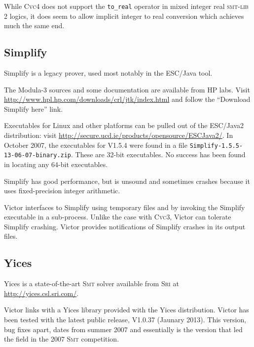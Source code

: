 \documentclass[12pt,fleqn]{article}
\newcommand{\cvcthree}{\textsc{Cvc}3}
\newcommand{\cvcfour}{\textsc{Cvc}4}
\newcommand{\yices}{Yices}
\newcommand{\smt}{\textsc{Smt}}
\newcommand{\sri}{\textsc{Sri}}
\newcommand{\smtlib}{\textsc{smt-lib}}
\begin{document}
While \cvcfour{} does not support the \verb+to_real+ operator in mixed
integer real \smtlib{} 2 logics, it does seem to allow implicit
integer to real conversion which achieves much the same end.

\subsection{Simplify}

Simplify is a legacy prover, used most notably in the ESC/Java tool. 

The Modula-3 sources and some documentation are available from HP labs.
Visit \url{http://www.hpl.hp.com/downloads/crl/jtk/index.html} and follow
the ``Download Simplify here'' link.

Executables for Linux and other platforms can be pulled out of the
ESC/Java2 distribution: visit
\url{http://secure.ucd.ie/products/opensource/ESCJava2/}.
In October 2007, the executables for V1.5.4 were found in a file 
\texttt{Simplify-1.5.5-13-06-07-binary.zip}.  These are 32-bit executables.
No success has been found in locating any 64-bit executables. 

Simplify has good performance, but is unsound and sometimes crashes
because it uses fixed-precision integer arithmetic.

Victor interfaces to Simplify using temporary files and by invoking
the Simplify executable in a sub-process.  Unlike the case with
\cvcthree{}, Victor can tolerate Simplify crashing.  Victor provides
notifications of Simplify crashes in its output files.


\subsection{Yices}

\yices{} is a state-of-the-art \smt{} solver available from \sri{} at
\url{http://yices.csl.sri.com/}.

Victor links with a \yices{} library provided with the \yices{}
distribution.  Victor has been tested with the latest public release,
V1.0.37 (Jaunary 2013).  This version, bug fixes apart, dates from
summer 2007 and essentially is the version that led the field in the
2007 \smt{} competition.
\end{document}
